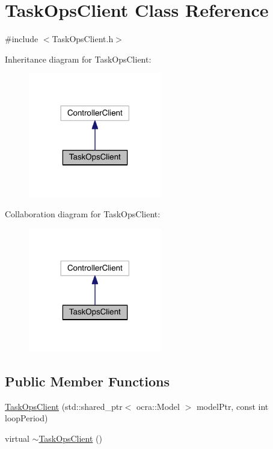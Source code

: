 \hypertarget{classTaskOpsClient}{}\section{Task\+Ops\+Client Class Reference}
\label{classTaskOpsClient}


{\ttfamily \#include $<$Task\+Ops\+Client.\+h$>$}



Inheritance diagram for Task\+Ops\+Client\+:\nopagebreak
\begin{figure}[H]
\begin{center}
\leavevmode
\includegraphics[width=165pt]{classTaskOpsClient__inherit__graph}
\end{center}
\end{figure}


Collaboration diagram for Task\+Ops\+Client\+:\nopagebreak
\begin{figure}[H]
\begin{center}
\leavevmode
\includegraphics[width=165pt]{classTaskOpsClient__coll__graph}
\end{center}
\end{figure}
\subsection*{Public Member Functions}
\begin{DoxyCompactItemize}
\item 
\hyperlink{classTaskOpsClient_a6d3842de3255a78526ced7953428452c}{Task\+Ops\+Client} (std\+::shared\+\_\+ptr$<$ ocra\+::\+Model $>$ model\+Ptr, const int loop\+Period)
\item 
virtual \hyperlink{classTaskOpsClient_a80a5c71dd04ab7a07d4ffb8116244cdd}{$\sim$\+Task\+Ops\+Client} ()
\end{DoxyCompactItemize}
